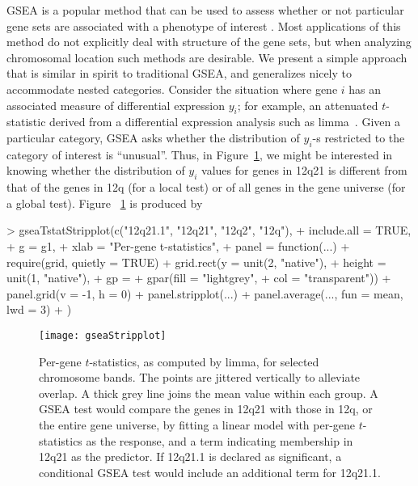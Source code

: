 \documentclass[11pt]{article}
\newcommand{\Rpackage}[1]{{\textsf{#1}}}
\begin{document}
GSEA is a popular method that can be used to assess whether or not
particular gene sets are associated with a phenotype of interest
\citep{Subramanian2005, Tian2005, JiangGent2007}.  Most applications
of this method do not explicitly deal with structure of the gene sets,
but when analyzing chromosomal location such methods are desirable.
We present a simple approach that is similar in spirit to traditional
GSEA, and generalizes nicely to accommodate nested categories.
Consider the situation where gene $i$ has an associated measure of
differential expression $y_i$; for example, an attenuated
$t$-statistic derived from a differential expression analysis such as
\Rpackage{limma}~\citep{limma}.  Given a particular category, GSEA
asks whether the distribution of $y_i$-s restricted to the category of
interest is ``unusual''.  Thus, in Figure~\ref{fig:gseaStripplot}, we
might be interested in knowing whether the distribution of $y_i$
values for genes in 12q21 is different from that of the genes in 12q
(for a local test) or of all genes in the gene universe (for a global
test).  Figure ~\ref{fig:gseaStripplot} is produced by
\begin{Schunk}
\begin{Sinput}
> gseaTstatStripplot(c("12q21.1", "12q21", "12q2", "12q"),
+                    include.all = TRUE, 
+                    g = g1,
+                    xlab = "Per-gene t-statistics", 
+                    panel = function(...) {
+                        require(grid, quietly = TRUE)
+                        grid.rect(y = unit(2, "native"), 
+                                  height = unit(1, "native"),
+                                  gp = 
+                                  gpar(fill = "lightgrey", 
+                                       col = "transparent"))
+                        panel.grid(v = -1, h = 0)
+                        panel.stripplot(...)
+                        panel.average(..., fun = mean, lwd = 3)
+                    })
\end{Sinput}
\end{Schunk}
\begin{figure}[tb]
\begin{center}
\texttt{[image: gseaStripplot]}
\end{center}
\caption{ Per-gene $t$-statistics, as computed by \Rpackage{limma},
  for selected chromosome bands.  The points are jittered vertically
  to alleviate overlap.  A thick grey line joins the mean value within
  each group.  A GSEA test would compare the genes in 12q21 with those
  in 12q, or the entire gene universe, by fitting a linear model with
  per-gene $t$-statistics as the response, and a term indicating
  membership in 12q21 as the predictor.  If 12q21.1 is declared as
  significant, a conditional GSEA test would include an additional
  term for 12q21.1. }
\label{fig:gseaStripplot}
\end{figure}
\end{document}
